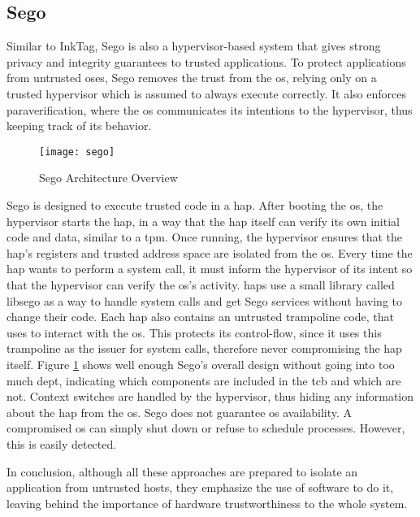 
\subsection{Sego} 

Similar to InkTag, Sego \cite{segoPaper} is also a hypervisor-based system that gives strong privacy and integrity guarantees to trusted applications. To protect applications from untrusted \gls{os}es, Sego removes the trust from the \gls{os}, relying only on a trusted hypervisor which is assumed to always execute correctly. It also enforces paraverification, where the \gls{os} communicates its intentions to the hypervisor, thus keeping track of its behavior.

\begin{figure}[htbp]
	\centering
	{\texttt{[image: sego]}}
	\caption{Sego Architecture Overview}
	\label{fig:segoArchitecture}
\end{figure}

Sego is designed to execute trusted code in a \gls{hap}.
After booting the \gls{os}, the hypervisor starts the \gls{hap}, in a way that the \gls{hap} itself can verify its own initial code and data, similar to a \gls{tpm}.
Once running, the hypervisor ensures that the \gls{hap}’s registers and trusted address space are isolated from the \gls{os}. Every time the \gls{hap} wants to perform a system call, it must inform
the hypervisor of its intent so that the hypervisor can verify the \gls{os}'s activity. \gls{hap}s use a
small library called libsego as a way to handle system calls and get Sego services without having to change their code. Each \gls{hap} also contains an untrusted trampoline code, that
uses to interact with the \gls{os}. This protects its control-flow, since it uses this trampoline as the issuer for system calls, therefore never compromising the \gls{hap} itself. Figure \ref{fig:segoArchitecture} shows well enough Sego’s overall design without going into too much dept, indicating which components are included in the \gls{tcb} and which are not.
Context switches are handled by the hypervisor, thus hiding any information about the \gls{hap} from the \gls{os}.
Sego does not guarantee \gls{os} availability. A compromised \gls{os} can simply shut down or refuse to schedule processes. However, this is easily detected.

In conclusion, although all these approaches are prepared to isolate an application from untrusted hosts, they emphasize the use of software to do it, leaving behind the importance of hardware trustworthiness to the whole system.

